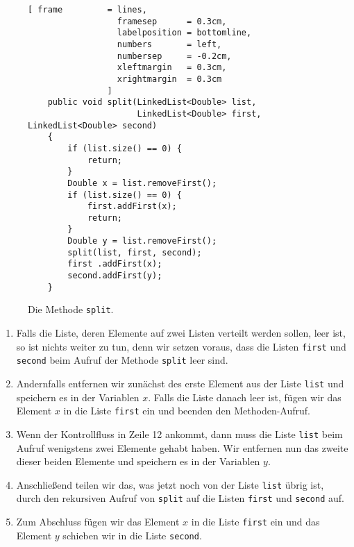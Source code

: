 \begin{figure}[!ht]
  \centering
\begin{Verbatim}[ frame         = lines, 
                  framesep      = 0.3cm, 
                  labelposition = bottomline,
                  numbers       = left,
                  numbersep     = -0.2cm,
                  xleftmargin   = 0.3cm,
                  xrightmargin  = 0.3cm
                ]
    public void split(LinkedList<Double> list, 
                      LinkedList<Double> first, LinkedList<Double> second) 
    {
        if (list.size() == 0) {
            return;
        }
        Double x = list.removeFirst();
        if (list.size() == 0) {
            first.addFirst(x);
            return;
        }
        Double y = list.removeFirst();
        split(list, first, second);
        first .addFirst(x);
        second.addFirst(y);
    }
\end{Verbatim}
\vspace*{-0.3cm}
  \caption{Die Methode \texttt{split}.}
  \label{fig:split}
\end{figure}
\begin{enumerate}
\item Falls die Liste, deren Elemente auf zwei Listen verteilt werden sollen, leer ist,
      so ist nichts weiter zu tun, denn wir setzen voraus, dass die Listen \texttt{first}
      und \texttt{second} beim Aufruf der Methode \texttt{split} leer sind.
\item Andernfalls entfernen wir zun\"achst des erste Element aus der Liste \texttt{list} und
      speichern es in der Variablen $x$.
      Falls die Liste danach leer ist, f\"ugen wir das Element $x$
      in die Liste \texttt{first} ein und beenden den Methoden-Aufruf.
\item Wenn der Kontrollfluss in Zeile 12 ankommt, dann muss die Liste \texttt{list} beim Aufruf
      wenigstens zwei Elemente gehabt haben.  Wir entfernen nun das zweite dieser beiden
      Elemente und speichern es in der Variablen $y$.
\item Anschlie\ss{}end teilen wir das, was jetzt noch von der Liste \texttt{list} \"ubrig ist,
      durch den rekursiven Aufruf von \texttt{split} auf die Listen \texttt{first} und
      \texttt{second} auf.
\item Zum Abschluss f\"ugen wir das Element $x$ in die Liste \texttt{first} ein
      und das Element $y$ schieben wir in die Liste \texttt{second}.
\end{enumerate}


